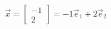 \documentclass[preview]{standalone}
\begin{document}
\begin{align*}
\vec{x}=\begin{bmatrix}-1\\2\end{bmatrix}=-1\vec{e}_1+2\vec{e}_2
\end{align*}
\end{document}
